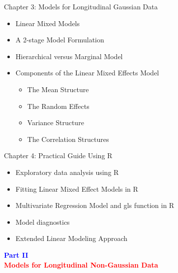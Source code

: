 \documentclass{beamer}
\begin{document}
\begin{frame}{Chapter 3: Models for Longitudinal Gaussian Data}
\begin{itemize}
	\item Linear Mixed Models  \vspace{0.5cm}
	\item A 2-stage Model Formulation \vspace{0.5cm}
	\item Hierarchical versus Marginal Model \vspace{0.5cm}
	\item Components of the Linear Mixed Effects Model \vspace{0.5cm}
	\begin{itemize}
		\item The Mean Structure  \vspace{0.5cm}
		\item The Random Effects  \vspace{0.5cm}
		\item Variance Structure  \vspace{0.5cm}
		\item The Correlation Structures
	\end{itemize}
\end{itemize}
\end{frame}

\begin{frame}{Chapter 4: Practical Guide Using R}
\begin{itemize}
	\item Exploratory data analysis using R \vspace{0.5cm}
	\item Fitting Linear Mixed Effect Models in R \vspace{0.5cm}
	\item Multivariate Regression Model and gls function in R \vspace{0.5cm}
	\item Model diagnostics \vspace{0.5cm}
	\item Extended Linear Modeling Approach
\end{itemize}
\end{frame}

\begin{frame}
\centering
\Large
\textbf{\textcolor{blue} {Part II}}\\
\vspace*{3mm}
\textbf{\textcolor{red} {Models for Longitudinal Non-Gaussian Data}}\\
\end{frame}
\end{document}
